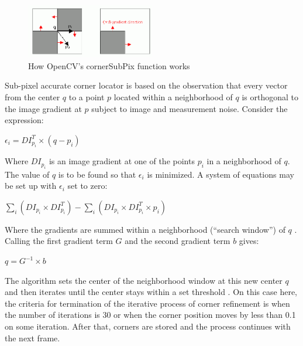 \documentclass[msc, a4paper, classic, en]{ufbathesis}
\begin{document}
\begin{figure}
\centering
\includegraphics[width=0.5\textwidth]{images/cornersubpix.png}
\caption{How OpenCV's cornerSubPix function works \cite{opencvfd}}
\label{fig:cornersubpix}
\end{figure}

Sub-pixel accurate corner locator is based on the observation that every vector from the center $q$ to a point $p$ located within a neighborhood of $q$ is orthogonal to the image gradient at $p$ subject to image and measurement noise. Consider the expression:

\begin{center}
$\epsilon_i = DI_{p_i}^T \times (q - p_i)$
\end{center}

Where $DI_{p_i}$ is an image gradient at one of the points $p_i$ in a neighborhood of $q$. The value of $q$ is to be found so that $\epsilon_i$ is minimized. A system of equations may be set up with $\epsilon_i$ set to zero:

\begin{center}
$\sum_{i}{(DI_{p_i} \times DI_{p_i}^T)} - \sum_{i}{(DI_{p_i} \times DI_{p_i}^T \times p_i)}$
\end{center}

Where the gradients are summed within a neighborhood (``search window'') of $q$ . Calling the first gradient term $G$ and the second gradient term $b$ gives:

\begin{center}
$q = G^{-1} \times b$
\end{center}

The algorithm sets the center of the neighborhood window at this new center $q$ and then iterates until the center stays within a set threshold \cite{opencvfd}. On this case here, the criteria for termination of the iterative process of corner refinement is when the number of iterations is 30 or when the corner position moves by less than 0.1 on some iteration. After that, corners are stored and the process continues with the next frame.
\end{document}
